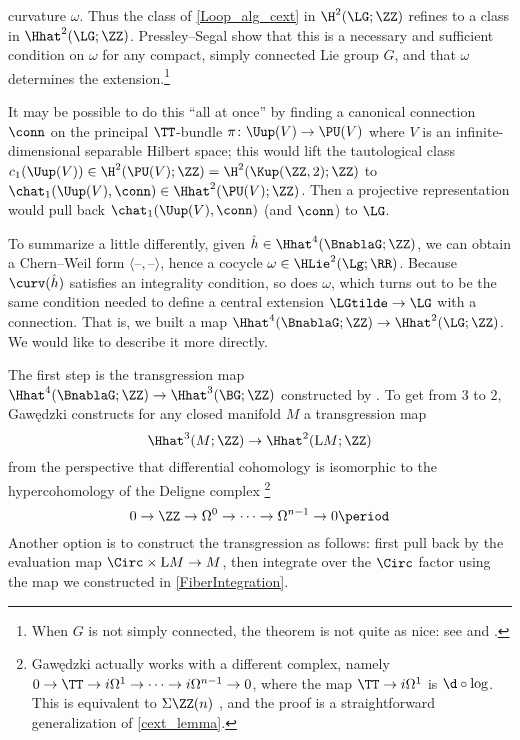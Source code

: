 curvature $\omega$. Thus the class of \eqref{Loop_alg_cext} in $\H^2(\LG;\ZZ)$ refines to a class in
$\Hhat^2(\LG;\ZZ)$. Pressley--Segal \cite[Theorem 4.4.1]{loop} show that this is a necessary and sufficient
condition on $\omega$ for any compact, simply connected Lie group $G$, and that $\omega$ determines the
extension.\footnote{When $G$ is not simply connected, the theorem is not quite as nice: see \cite[Theorem
4.6.9]{loop} and \cite{Wal17}.}
\begin{remark}
It may be possible to do this ``all at once'' by finding a canonical connection $\conn$ on the principal
$\TT$-bundle $\pi\colon \Uup(V)\to \PU(V)$ where $V$ is an infinite-dimensional separable Hilbert space;
this would lift the tautological class $c_1(\Uup(V))\in\H^2(\PU(V);\ZZ) = \H^2(\Kup(\ZZ, 2); \ZZ)$ to
$\chat_1(\Uup(V), \conn) \in \Hhat^2(\PU(V);\ZZ)$. Then a projective representation would pull back
$\chat_1(\Uup(V), \conn)$ (and $\conn$) to $\LG$.
\end{remark}
To summarize a little differently, given $\hat h\in\Hhat^4(\BnablaG;\ZZ)$, we can obtain a Chern--Weil form
$\langle\text{--}, \text{--}\rangle$, hence a cocycle $\omega\in\HLie^2(\Lg;\RR)$. Because $\curv(\hat h)$
satisfies an integrality condition, so does $\omega$, which turns out to be the same condition needed to define a
central extension $\LGtilde\to\LG$ with a connection. That is, we built a map
$\Hhat^4(\BnablaG;\ZZ)\to\Hhat^2(\LG;\ZZ)$. We would like to describe it more directly.

The first step is the transgression map $\Hhat^4(\BnablaG;\ZZ)\to\Hhat^3(\BG;\ZZ)$ constructed by \cite[\S
3]{CJMSW05}. To get from $3$ to $2$, Gawędzki \cite[\S 3]{Gaw88} constructs for any closed manifold $M$ a
transgression map
\begin{equation}
	\Hhat^3(M;\ZZ)\to\Hhat^2(\mathrm LM;\ZZ)
\end{equation}
from the perspective that differential cohomology is isomorphic to the
hypercohomology of the Deligne complex%
\footnote{Gawędzki actually works with a different complex,
namely $0\to \TT\to i\Omega^1\to\dotsb\to i\Omega^{n-1}\to 0$, where the map $\TT\to i\Omega^1$ is $\d\circ{\log}$.
This is equivalent to $\Sigma\ZZ(n)$ \cite[Remark 3.6]{BML94}, and the proof is a straightforward generalization of
\cref{cext_lemma}.} 
\begin{equation*}
	0\to\ZZ\to\Omega^0\to\dotsb\to\Omega^{n-1}\to 0 \period
\end{equation*}
Another option is to construct the transgression as follows: first pull back by the evaluation
map $\Circ\times \mathrm LM\to M$, then integrate over the $\Circ$ factor using the map we constructed in
\cref{FiberIntegration}.

